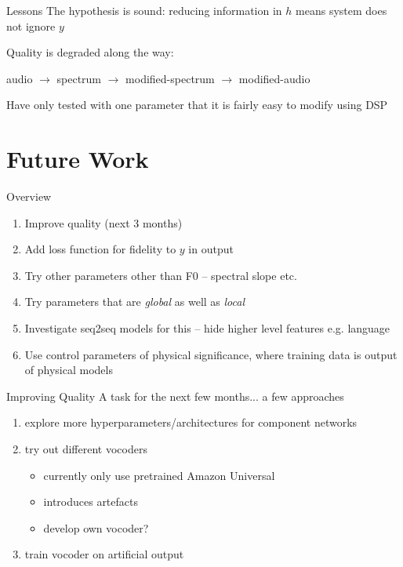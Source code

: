 \documentclass[10pt]{beamer}
\begin{document}
\begin{frame}{Lessons}
The hypothesis is sound: reducing information in $h$ means system does not ignore $y$

Quality is degraded along the way:

audio $\to$ spectrum $\to$ modified-spectrum $\to$ modified-audio

Have only tested with one parameter that it is fairly easy to modify using DSP
\end{frame} 

\section{Future Work}

\begin{frame}{Overview}
    \begin{enumerate}
        \item Improve quality (next 3 months)
        \item Add loss function for fidelity to $y$ in output
        \item Try other parameters other than F0 -- spectral slope etc.
        \item Try parameters that are \emph{global} as well as \emph{local}
        \item Investigate seq2seq models for this -- hide higher level features e.g. language
        \item Use control parameters of physical significance, where training data is output of physical models
    \end{enumerate}
\end{frame}


\begin{frame}{Improving Quality}
A task for the next few months... a few approaches
\begin{enumerate}
    \item explore more hyperparameters/architectures for component networks
    \item try out different vocoders 
    \begin{itemize}
        \item currently only use pretrained Amazon Universal
        \item introduces artefacts
        \item develop own vocoder?
    \end{itemize}
    \item train vocoder on artificial output
\end{enumerate}

\end{frame}
\end{document}
